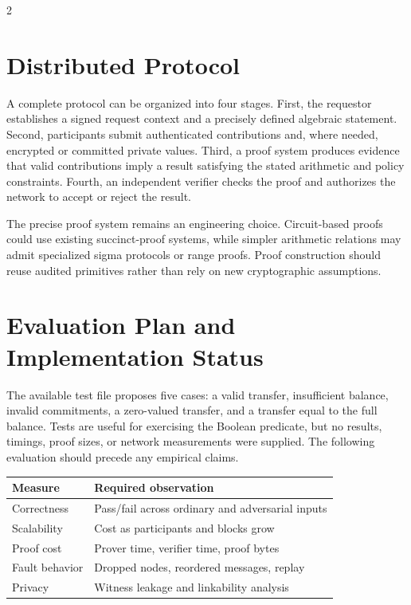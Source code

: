 \documentclass[10pt,letterpaper]{article}
\begin{document}
\begin{multicols}{2}
\section{Distributed Protocol}
A complete protocol can be organized into four stages. First, the requestor establishes a signed request context and a precisely defined algebraic statement. Second, participants submit authenticated contributions and, where needed, encrypted or committed private values. Third, a proof system produces evidence that valid contributions imply a result satisfying the stated arithmetic and policy constraints. Fourth, an independent verifier checks the proof and authorizes the network to accept or reject the result.

The precise proof system remains an engineering choice. Circuit-based proofs could use existing succinct-proof systems, while simpler arithmetic relations may admit specialized sigma protocols or range proofs. Proof construction should reuse audited primitives rather than rely on new cryptographic assumptions.

\section{Evaluation Plan and Implementation Status}
The available test file proposes five cases: a valid transfer, insufficient balance, invalid commitments, a zero-valued transfer, and a transfer equal to the full balance. Tests are useful for exercising the Boolean predicate, but no results, timings, proof sizes, or network measurements were supplied. The following evaluation should precede any empirical claims.

\begin{center}
\begin{minipage}{\columnwidth}
\centering\small
\begin{tabular}{p{}p{}}
\toprule
Measure & Required observation\\
\midrule
Correctness & Pass/fail across ordinary and adversarial inputs\\
Scalability & Cost as participants and blocks grow\\
Proof cost & Prover time, verifier time, proof bytes\\
Fault behavior & Dropped nodes, reordered messages, replay\\
Privacy & Witness leakage and linkability analysis\\
\bottomrule
\end{tabular}
\end{minipage}
\end{center}


\end{multicols}
\end{document}
